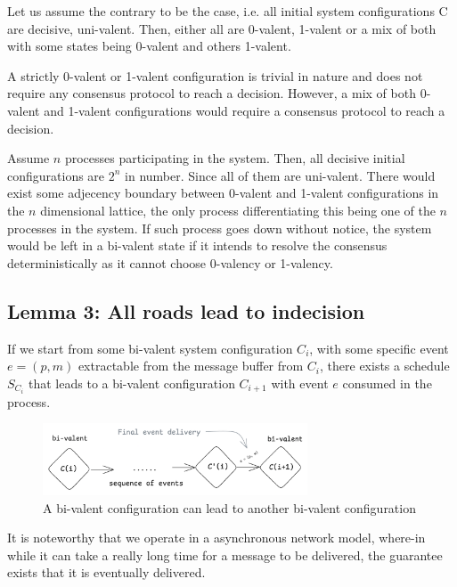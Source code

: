 Let us assume the contrary to be the case, i.e. all initial system configurations C are decisive, uni-valent. Then, either all are 0-valent, 1-valent or a mix of both with some states being 0-valent and others 1-valent.

A strictly 0-valent or 1-valent configuration is trivial in nature and does not require any consensus protocol to reach a decision. However, a mix of both 0-valent and 1-valent configurations would require a consensus protocol to reach a decision.

Assume $n$ processes participating in the system. Then, all decisive initial configurations are $2^n$ in number. Since all of them are uni-valent. There would exist some adjecency boundary between 0-valent and 1-valent configurations in the $n$ dimensional lattice, the only process differentiating this being one of the $n$ processes in the system. If such process goes down without notice, the system would be left in a bi-valent state if it intends to resolve the consensus deterministically as it cannot choose 0-valency or 1-valency.

\subsection{Lemma 3: All roads lead to indecision}
If we start from some bi-valent system configuration $C_i$, with some specific event $e = (p, m)$ extractable from the message buffer from $C_i$, there exists a schedule $S_{C_i}$ that leads to a bi-valent configuration $C_{i+1}$ with event $e$ consumed in the process.

\begin{figure}
    \centering
    \includegraphics[width=0.7\textwidth]{general-problems/assets/flp-sequence-bivalent-to-bivalent.png}
    \caption{A bi-valent configuration can lead to another bi-valent configuration}
    \label{fig:bivalent-to-bivalent}
\end{figure}

It is noteworthy that we operate in a asynchronous network model, where-in while it can take a really long time for a message to be delivered, the guarantee exists that it is eventually delivered.

